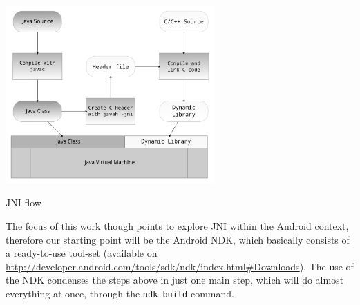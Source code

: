 \documentclass[a4paper,10pt]{article}
\makeatletter
\newenvironment{figurehere}{\def\@captype{figure}\vspace{2ex}}{\vspace{2ex}}
\newcommand{\keyword}[1]{\texttt{#1}}
\makeatother
\begin{document}
\begin{multicols}{2}
\begin{figurehere}
 \centering
 \includegraphics[width=8cm]{./figures/jni-flow.pdf}
 \caption{JNI flow}
 \label{fig:jni-flow}
\end{figurehere}

The focus of this work though points to explore JNI within the Android context,
therefore our starting point will be the Android NDK, which basically consists
of a ready-to-use tool-set (available on \url{http://developer.android.com/tools/sdk/ndk/index.html#Downloads}). The use
of the NDK condenses the steps above in just one main step, which will do almost
everything at once, through the \keyword{ndk-build} command.



\end{multicols}
\end{document}
